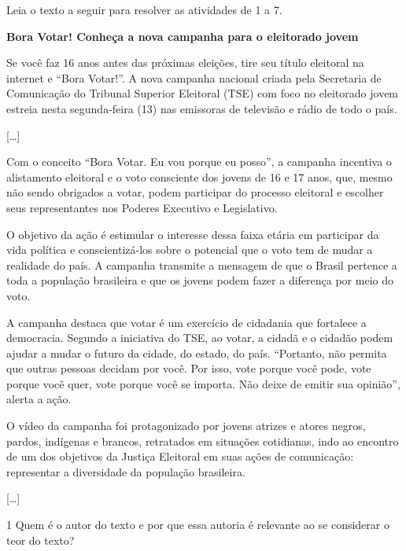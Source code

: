Leia o texto a seguir para resolver as atividades de 1 a 7.

\begin{myquote}
\textbf{Bora Votar! Conheça a nova campanha para o eleitorado jovem}

Se você faz 16 anos antes das próximas eleições, tire seu título
eleitoral na internet e ``Bora Votar!''. A nova campanha nacional criada
pela Secretaria de Comunicação do Tribunal Superior Eleitoral (TSE) com
foco no eleitorado jovem estreia nesta segunda-feira (13) nas emissoras
de televisão e rádio de todo o país.

{[}\ldots{]}

Com o conceito ``Bora Votar. Eu vou porque eu posso'', a campanha
incentiva o alistamento eleitoral e o voto consciente dos jovens de 16 e
17 anos, que, mesmo não sendo obrigados a votar, podem participar do
processo eleitoral e escolher seus representantes nos Poderes Executivo
e Legislativo.

O objetivo da ação é estimular o interesse dessa faixa etária em
participar da vida política e conscientizá-los sobre o potencial que o
voto tem de mudar a realidade do país. A campanha transmite a mensagem
de que o Brasil pertence a toda a população brasileira e que os jovens
podem fazer a diferença por meio do voto.

A campanha destaca que votar é um exercício de cidadania que fortalece a
democracia. Segundo a iniciativa do TSE, ao votar, a cidadã e o cidadão
podem ajudar a mudar o futuro da cidade, do estado, do país. ``Portanto,
não permita que outras pessoas decidam por você. Por isso, vote porque
você pode, vote porque você quer, vote porque você se importa. Não deixe
de emitir sua opinião'', alerta a ação.

O vídeo da campanha foi protagonizado por jovens atrizes e atores
negros, pardos, indígenas e brancos, retratados em situações cotidianas,
indo ao encontro de um dos objetivos da Justiça Eleitoral em suas ações
de comunicação: representar a diversidade da população brasileira.

{[}\ldots{]}


\end{myquote}

\num{1} Quem é o autor do texto e por que essa autoria é relevante ao se
considerar o teor do texto?

